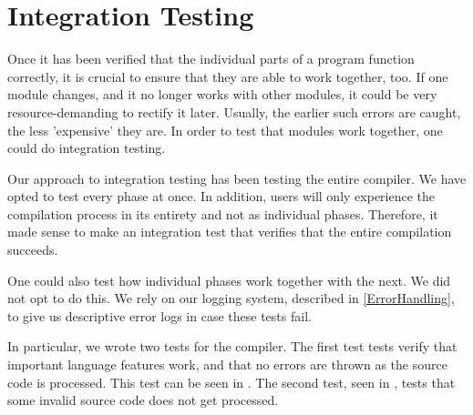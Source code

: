 \section{Integration Testing} \label{sec:IntTesting}
Once it has been verified that the individual parts of a program function correctly, it is crucial to ensure that they are able to work together, too.
If one module changes, and it no longer works with other modules, it could be very resource-demanding to rectify it later.
Usually, the earlier such errors are caught, the less 'expensive' they are.
In order to test that modules work together, one could do integration testing.

Our approach to integration testing has been testing the entire compiler. We have opted to test every phase at once. In addition, users will only experience the compilation process in its entirety and not as individual phases. Therefore, it made sense to make an integration test that verifies that the entire compilation succeeds.

One could also test how individual phases work together with the next. We did not opt to do this. We rely on our logging system, described in \ref{ErrorHandling}, to give us descriptive error logs in case these tests fail.

In particular, we wrote two tests for the \dazel{} compiler. The first test tests verify that important language features work, and that no errors are thrown as the source code is processed. This test can be seen in . The second test, seen in , tests that some invalid source code does not get processed.

